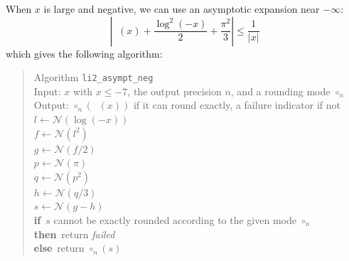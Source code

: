 \documentclass[12pt]{amsart}
\DeclareMathOperator{\LiTwo}{Li_2}
\def\N{{\mathcal N}}
\def\If{{\bf if}}
\def\then{{\bf then}}
\def\Else{{\bf else}}
\begin{document}
When $x$ is large and negative, we can use an asymptotic expansion near 
$-\infty$:
\[
\left|\LiTwo(x) + \frac{\log^2(-x)}{2} + \frac{\pi^2}{3}\right| \leq 
\frac{1}{|x|}
\]
which gives the following algorithm:
\begin{quote}
  Algorithm {\tt li2\_asympt\_neg}\\
  Input: $x$ with $x \leq -7$, the output precision $n$, and a rounding mode
  $\circ_n$ \\
  Output: $\circ_n(\LiTwo(x))$ if it can round exactly, a failure indicator
  if not\\
  $l \leftarrow \N(\log(-x))$ \\
  $f \leftarrow \N(l^2)$\\
  $g \leftarrow \N(f/2)$\\
  $p \leftarrow \N(\pi)$\\
  $q \leftarrow \N(p^2)$\\
  $h \leftarrow \N(q/3)$\\
  $s \leftarrow \N(g-h)$\\
  \If\ $s$ cannot be exactly rounded according to the given mode $\circ_n$\\
  \then\ return {\em failed}\\
  \Else\ return $\circ_n(s)$
\end{quote}
\end{document}
